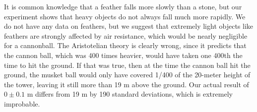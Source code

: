        It is common knowledge that a feather falls more
slowly than a stone, but our experiment shows that heavy
objects do not always fall much more rapidly. We do not have
any data on feathers, but we suggest that extremely light
objects like feathers are strongly affected by air
resistance, which would be nearly negligible for a
cannonball. The
Aristotelian theory is clearly wrong, since it predicts that
the cannon ball, which was 400 times heavier, would have
taken one 400th the time to hit the ground. If that was true,
then at the time the cannon ball hit the ground, the musket
ball would only have covered 1/400 of the 20-meter height
of the tower, leaving it still more than 19 m above the
ground. Our actual result of $0\pm 0.1$ m differs from
19 m by 190 standard deviations, which is extremely
improbable.

